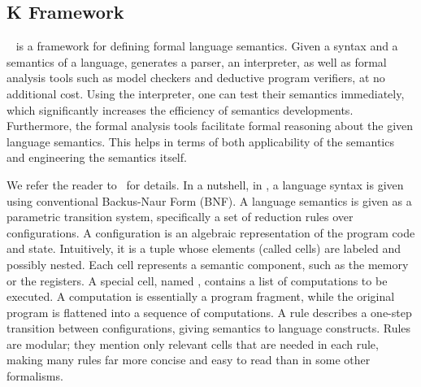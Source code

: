 \subsection{K Framework}\label{sec:KF}

\K~\cite{k-primer-2013-v32}  is a framework for
defining formal language semantics. Given a syntax and a semantics of a language, \K
generates a parser, an interpreter, as well as formal analysis tools such as
model checkers and deductive program verifiers, at no additional cost. Using
the interpreter, one can test their semantics immediately, which significantly
increases the efficiency of semantics developments. Furthermore, the formal
analysis tools facilitate formal reasoning about the given language semantics.
This helps in terms of both applicability of the semantics and
engineering the semantics itself.

We   refer the reader to~\cite{k-primer-2013-v32, rosu-serbanuta-2010-jlap} for
 details. In a nutshell, in \K, a language syntax is given using conventional
Backus-Naur Form (BNF). A language semantics is given as a parametric
transition system, specifically a set of reduction rules over configurations. A configuration is an algebraic representation of the
program code and state. Intuitively, it is a tuple whose elements
(called cells) are labeled and possibly nested. Each cell represents a
semantic component, such as the memory or the registers. A special cell, named , contains a
list of computations to be executed. A computation is essentially
a program fragment, while the original program is flattened into a
sequence of computations. A rule describes a one-step transition
between configurations, giving semantics to language
constructs. Rules are modular; they mention only relevant cells that
are needed in each rule, making many rules far more concise and easy to read
than in some other formalisms.




% 
